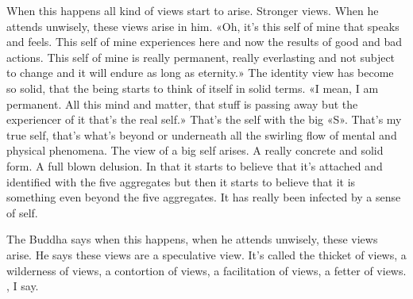 \documentclass[letterpaper,10pt,english]{sphinxmanual}
\begin{document}
\sphinxAtStartPar
When  this  happens  all  kind  of  views  start  to  arise.  Stronger  views.
When  he  attends  unwisely,  these  views  arise  in  him.  «Oh,  it’s  this  self  of
mine that speaks and feels. This self of mine experiences here and now the
results of good and bad actions. This self of mine is really permanent, really
everlasting and not subject to change and it will endure as long as eternity.»
The identity view has become so solid, that the being starts to think of itself
in solid terms. «I mean, I am permanent. All this mind and matter, that stuff
is passing away but the experiencer of it that’s the real self.» That’s the self
with  the  big  «S». That’s  my  true  self,  that’s  what’s  beyond  or  underneath
all the swirling flow of mental and physical phenomena. The view of a big
self arises. A really concrete and solid form. A full blown delusion. In that it
starts to believe that it’s attached and identified with the five aggregates but
then it starts to believe that it is something even beyond the five aggregates.
It has really been infected by a sense of self.

\sphinxAtStartPar
The Buddha says when this happens, when he attends unwisely, these
views arise. He says these views are a speculative view. It’s called the thicket
of views, a wilderness of views, a contortion of views, a facilitation of views,
a  fetter  of  views.
, I say.
\end{document}
